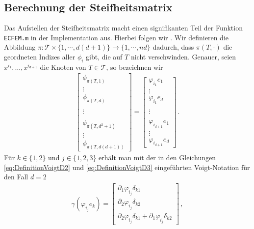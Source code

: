 \documentclass{scrartcl}
\newcommand{\cT}{\mathcal{T}}
\newcommand{\vect}[1]{\begin{bmatrix} #1 \end{bmatrix}}
\begin{document}
\subsection{Berechnung der Steifheitsmatrix}
Das Aufstellen der Steifheitsmatrix macht einen signifikanten Teil der Funktion \texttt{ECFEM.m} in der Implementation aus. Hierbei folgen wir \cite[S.244-247]{Alb-2002}.
Wir definieren die Abbildung $\pi\colon\cT\times\{1,\cdots,d(d+1)\}\to\{1,\cdots,nd\}$ dadurch, dass $\pi(T,\cdot)$ die geordneten Indizes aller $\phi_i$ gibt, die auf $T$ nicht verschwinden.
Genauer, seien $x^{i_1},\dots,x^{i_{d+1}}$ die Knoten von $T\in\cT$, so bezeichnen wir
\begin{align*}
	\vect{\phi_{\pi(T,1)} \\ \vdots \\ \phi_{\pi(T,d)} \\ \\ \vdots  \\ \\ \phi_{\pi(T,d^2+1)} \\ \vdots \\ \phi_{\pi(T,d(d+1))}}
	= \vect{ \varphi_{i_1}e_1 \\ \vdots \\ \varphi_{i_1}e_d
	\\ \\ \vdots \\ \\ \varphi_{i_{d+1}}e_1 \\ \vdots \\\varphi_{i_{d+1}}e_d}\,.
\end{align*}
Für $k\in\{1,2\}$ und $j\in\{1,2,3\}$ erhält man mit der in den Gleichungen \eqref{eq:DefinitionVoigtD2} und \eqref{eq:DefinitionVoigtD3} eingeführten Voigt-Notation für den Fall $d=2$
\begin{align*}
	\gamma(\varphi_{i_j}e_k)
	= \vect{ \partial_1\varphi_{i_j}\delta_{k1} \\ \partial_2\varphi_{i_j}\delta_{k2} \\ \partial_2\varphi_{i_j}\delta_{k1}+\partial_1\varphi_{i_j}\delta_{k2} } \,,
\end{align*}
\end{document}
